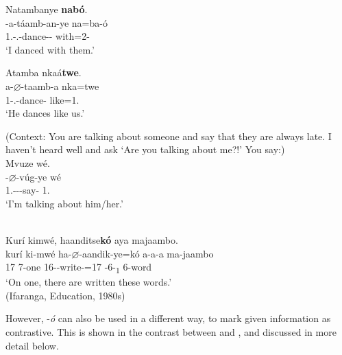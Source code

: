 \documentclass[output=paper]{langscibook}
\begin{document}
\ea
\label{bkm:Ref74930335}
Natambanye \textbf{nabó}.\\
\gll
\N{}-a-táamb-an-ye  na=ba-ó\\
1\SG.\SM-\N.\PST-{}dance-\ASS-\PFV{}  with=2-\PRO{}\\
\glt
‘I danced with them.’\\

\z
\pagebreak

\ea
\label{bkm:Ref74930344}
Atamba nkaá\textbf{twe}.\\
\gll
a-$\varnothing$-taamb-a  nka=twe\\
1\SM-\PRS.\CJ{}-dance-\FV{}  like=1\PL.\PRO{}\\
\glt
‘He dances like us.’\\

\z

\ea
\label{bkm:Ref75439017}
(Context: You are talking about someone and say that they are always late. I haven’t heard well and ask ‘Are you talking about me?!’ You say:)\\
Mvuze wé.\\
\gll
\N{}-$\varnothing$-vúg-ye  wé\\
1\SG.\SM-\PRS-\CJ-{}say-\PFV{}  1.\PRO{}\\
\glt
‘I’m talking about him/her.’\\

\z

\ea
\label{bkm:Ref75359891}
\citep[134]{Nshemezimana2016}\\
Kurí kimwé, haanditse\textbf{kó} aya majaambo.\\
\gll
kurí  ki-mwé  ha-$\varnothing$-aandik-ye=kó a-a-a   ma-jaambo\\
17  7-one  16\SM-\CJ-{}write-\PFV{}=17{} \AUG{}-6-\DEM{}\textsubscript{1}  6-word\\
\glt
‘On one, there are written these words.’\\
  (Ifaranga, Education, 1980s)


\z

However, -\textit{ó} can also be used in a different way, to mark given information as contrastive. This is shown in the contrast between  and , and discussed in more detail below.
\end{document}
